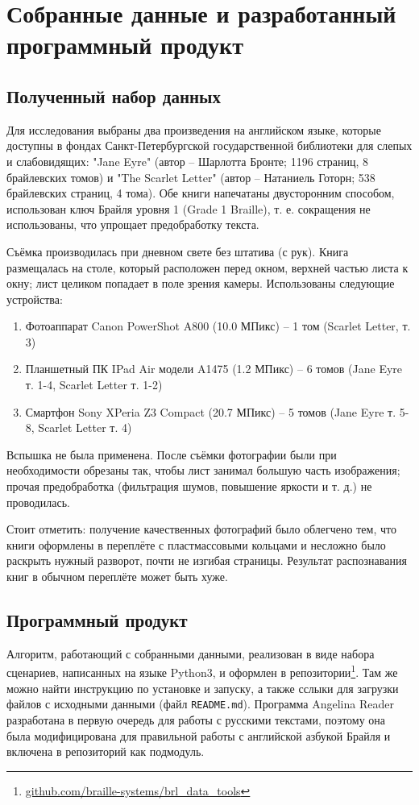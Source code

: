 \documentclass{main.tex}[subfiles]
\begin{document}
\section{Собранные данные и разработанный программный продукт}
\subsection{Полученный набор данных}

Для исследования выбраны два произведения на английском языке, которые доступны в фондах Санкт-Петербургской государственной библиотеки для слепых и слабовидящих: "Jane Eyre"\hspace{0pt} (автор -- Шарлотта Бронте; 1196 страниц, 8 брайлевских томов) и "The Scarlet Letter"\hspace{0pt} (автор -- Натаниель Готорн; 538 брайлевских страниц, 4 тома).
Обе книги напечатаны двусторонним способом, использован ключ Брайля уровня 1 (Grade 1 Braille), т. е. сокращения не использованы, что упрощает предобработку текста.

Съёмка производилась при дневном свете без штатива (с рук).
Книга размещалась на столе, который расположен перед окном, верхней частью листа к окну; лист целиком попадает в поле зрения камеры.
Использованы следующие устройства:

\begin{enumerate}[noitemsep]
    \item Фотоаппарат Canon PowerShot A800 (10.0 МПикс) -- 1 том (Scarlet Letter, т. 3)
    \item Планшетный ПК IPad Air модели A1475 (1.2 МПикс) -- 6 томов (Jane Eyre т. 1-4, Scarlet Letter т. 1-2)
    \item Смартфон Sony XPeria Z3 Compact (20.7 МПикс) -- 5 томов (Jane Eyre т. 5-8, Scarlet Letter т. 4)
\end{enumerate}
Вспышка не была применена.
После съёмки фотографии были при необходимости обрезаны так, чтобы лист занимал большую часть изображения; прочая предобработка (фильтрация шумов, повышение яркости и т. д.) не проводилась.

Стоит отметить: получение качественных фотографий было облегчено тем, что книги оформлены в переплёте с пластмассовыми кольцами и несложно было раскрыть нужный разворот, почти не изгибая страницы.
Результат распознавания книг в обычном переплёте может быть хуже.

\subsection{Программный продукт}

Алгоритм, работающий с собранными данными, реализован в виде набора сценариев, написанных на языке Python3, и оформлен в репозитории\footnote{\href{https://github.com/braille-systems/brl_data_tools}{github.com/braille-systems/brl\_data\_tools}}.
Там же можно найти инструкцию по установке и запуску, а также сслыки для загрузки файлов с исходными данными (файл \texttt{README.md}).
Программа Angelina Reader разработана в первую очередь для работы с русскими текстами, поэтому она была модифицирована для правильной работы с английской азбукой Брайля и включена в репозиторий как подмодуль.
\end{document}

